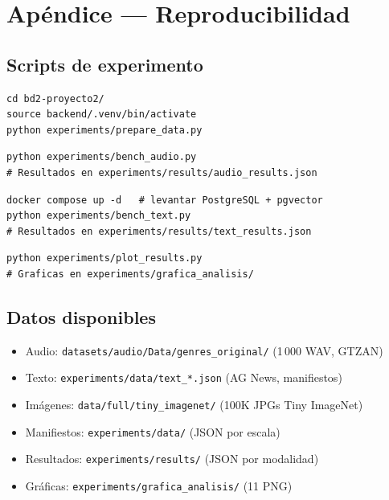 \documentclass[12pt,a4paper]{article}
\begin{document}
\section*{Apéndice — Reproducibilidad}

\subsection*{Scripts de experimento}

\begin{lstlisting}[caption={Preparar datos}]
cd bd2-proyecto2/
source backend/.venv/bin/activate
python experiments/prepare_data.py
\end{lstlisting}

\begin{lstlisting}[caption={Ejecutar benchmark de audio}]
python experiments/bench_audio.py
# Resultados en experiments/results/audio_results.json
\end{lstlisting}

\begin{lstlisting}[caption={Ejecutar benchmark de texto (requiere Docker)}]
docker compose up -d   # levantar PostgreSQL + pgvector
python experiments/bench_text.py
# Resultados en experiments/results/text_results.json
\end{lstlisting}

\begin{lstlisting}[caption={Generar gráficas comparativas}]
python experiments/plot_results.py
# Graficas en experiments/grafica_analisis/
\end{lstlisting}

\subsection*{Datos disponibles}

\begin{itemize}
  \item Audio: \texttt{datasets/audio/Data/genres\_original/} (1\,000 WAV, GTZAN)
  \item Texto: \texttt{experiments/data/text\_*.json} (AG News, manifiestos)
  \item Imágenes: \texttt{data/full/tiny\_imagenet/} (100K JPGs Tiny ImageNet)
  \item Manifiestos: \texttt{experiments/data/} (JSON por escala)
  \item Resultados: \texttt{experiments/results/} (JSON por modalidad)
  \item Gráficas: \texttt{experiments/grafica\_analisis/} (11 PNG)
\end{itemize}

\vfill
\end{document}

